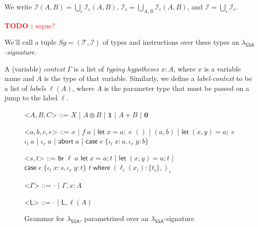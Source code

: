 \documentclass[acmsmall,screen,review]{acmart}
\newcounter{todos}
\newcommand{\TODO}[1]{{
  \stepcounter{todos}
  \begin{center}\large{\textcolor{red}{\textbf{TODO \arabic{todos}:} #1}}\end{center}
}}
\newcommand{\mc}[1]{\ensuremath{\mathcal{#1}}}
\newcommand{\ms}[1]{\ensuremath{\mathsf{#1}}}
\newcommand{\lto}{:}
\newcommand{\linl}[1]{\iota_l\;{#1}}
\newcommand{\linr}[1]{\iota_r\;{#1}}
\newcommand{\labort}[1]{\ms{abort}\;{#1}}
\newcommand{\letexpr}[3]{\ensuremath{\ms{let}\;#1 = #2;\;#3}}
\newcommand{\caseexpr}[5]{\ms{case}\;#1\;\{\linl{#2} \lto #3, \linr{#4} \lto #5\}}
\newcommand{\letstmt}[3]{\ensuremath{\ms{let}\;#1 = #2; #3}}
\newcommand{\brb}[2]{\ms{br}\;#1\;#2}
\newcommand{\casestmt}[5]{\ms{case}\;#1\;\{\linl{#2} \lto #3, \linr{#4} \lto #5\}}
\newcommand{\where}[2]{#1\;\ms{where}\;#2}
\newcommand{\wbranch}[3]{#1(#2) \lto \{#3\}}
\newcommand{\bhyp}[2]{#1 : #2}
\newcommand{\lhyp}[2]{#1(#2)}
\newcommand{\isotopessa}{\(\lambda_{\ms{SSA}}\)}
\begin{document}
We write $\mc{I}(A, B) = \bigcup_\epsilon\mc{I}_\epsilon(A, B)$, $\mc{I}_\epsilon = \bigcup_{A,
B}\mc{I}_\epsilon(A, B)$, and $\mc{I} = \bigcup_\epsilon\mc{I}_\epsilon$.

\TODO{segue?}

We'll call a tuple $Sg = (\mc{T}, \mc{I})$ of types and instructions over these types an
\emph{\isotopessa{}-signature}.

A (variable) \textit{context} $\Gamma$ is a list of \textit{typing hypotheses} $\bhyp{x}{A}$,
where $x$ is a variable name and $A$ is the type of that variable. Similarly, we define a
\textit{label-context} to be a list of \textit{labels} $\lhyp{\ell}{A}$, where $A$ is the parameter
type that must be passed on a jump to the label $\ell$.

\begin{figure}[H]
  \begin{center}
    \begin{grammar}
      <\(A, B, C\)> ::= 
      \(X\)
      \;|\; \(A \otimes B\)
      \;|\; \(\mathbf{1}\)
      \;|\; \(A + B\)
      \;|\; \(\mathbf{0}\)

      <\(a, b, c, e\)> ::= \(x\) 
      \;|\;  \(f\;a\)
      \;|\; \(\letexpr{x}{a}{e}\)
      \alt  \(()\)
      \;|\; \((a, b)\)
      \;|\; \(\letexpr{(x, y)}{a}{e}\)
      \alt  \(\linl{a}\) 
      \;|\; \(\linr{a}\)
      \;|\; \(\labort{a}\)
      \;|\; \(\caseexpr{e}{x}{a}{y}{b}\)
      
      <\(s, t\)> ::= \(\brb{\ell}{a}\) 
      \alt  \(\letstmt{x}{a}{t}\)
      \;|\; \(\letstmt{(x, y)}{a}{t}\)
      \;|\; \(\casestmt{e}{x}{s}{y}{t}\)
      \alt  \(\where{t}{(\wbranch{\ell_i}{x_i}{t_i},)_i}\)

      <\(\Gamma\)> ::= \(\cdot\) \;|\; \(\Gamma, \bhyp{x}{A}\)

      <\(\ms{L}\)> ::= \(\cdot\) \;|\; \(\ms{L}, \lhyp{\ell}{A}\)
    \end{grammar}
  \end{center}
  \caption{Grammar for \isotopessa{}, parametrized over an \isotopessa{}-signature}
  \Description{}
  \label{fig:ssa-grammar}
\end{figure}
\end{document}
